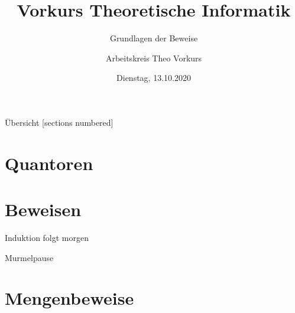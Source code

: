 

\title{Vorkurs Theoretische Informatik}
\subtitle{Grundlagen der Beweise}
\date{Dienstag, 13.10.2020}
\author{Arbeitskreis Theo Vorkurs}



\maketitle

\begin{frame}[fragile]{Übersicht}
  [sections numbered]
  \tableofcontents
\end{frame}

\section{Quantoren}



\section{Beweisen}









\begin{frame}[standout]
  Induktion folgt morgen
\end{frame}

\begin{frame}[standout]
    Murmelpause
\end{frame}


\section{Mengenbeweise}






